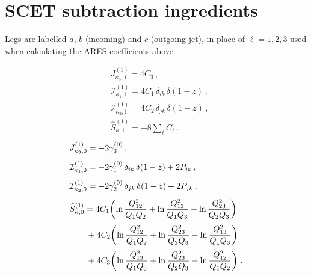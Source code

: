 
\chapter{SCET subtraction ingredients}
\label{ap:N-jet-ing}
 Legs are labelled $a$, $b$ (incoming) and
$c$ (outgoing jet), in place of $\ell=1,2,3$ used
when calculating the \textsc{ARES} coefficients above.


\begin{subequations}
\label{eq:C11-ingred}
\begin{align}
&J_{\kappa_3,1}^{(1)} = 4C_3\,, \\[1ex]
&\mathcal{I}_{\kappa_1,1}^{(1)} = 4C_1\,\delta_{ik}\,\delta(1-z)\,, \\[1ex]
&\mathcal{I}_{\kappa_2,1}^{(1)} = 4C_2\,\delta_{jk}\,\delta(1-z)\,, \\[1ex]
&\widehat{S}_{\kappa,1}^{(1)} = -8\sum_{\ell}C_{\ell}\,.
\end{align}
\end{subequations}
%
\begin{subequations}
\label{eq:C10-ingred}
\begin{align}
&J_{\kappa_3,0}^{(1)} = -2\gamma_3^{(0)}\,, \\[1ex]
&\mathcal{I}_{\kappa_1,0}^{(1)} = -2\gamma_1^{(0)}\,\delta_{ik}\,\delta(1-z)+2P_{ik}\,, \\[1ex]
&\mathcal{I}_{\kappa_2,0}^{(1)} = -2\gamma_2^{(0)}\,\delta_{jk}\,\delta(1-z)+2P_{jk}\,, \\[1ex]
&\widehat{S}_{\kappa,0}^{(1)} =
    4C_1\!\left(\ln\frac{Q_{12}^2}{Q_1 Q_2}+\ln\frac{Q_{13}^2}{Q_1 Q_3}
    -\ln\frac{Q_{23}^2}{Q_2 Q_3}\right) \notag\\[0.5ex]
  &\qquad+4C_2\!\left(\ln\frac{Q_{12}^2}{Q_1 Q_2}+\ln\frac{Q_{23}^2}{Q_2 Q_3}
    -\ln\frac{Q_{13}^2}{Q_1 Q_3}\right) \notag\\[0.5ex]
  &\qquad+4C_3\!\left(\ln\frac{Q_{13}^2}{Q_1 Q_3}+\ln\frac{Q_{23}^2}{Q_2 Q_3}
    -\ln\frac{Q_{12}^2}{Q_1 Q_2}\right)\,.
\end{align}
\end{subequations}
